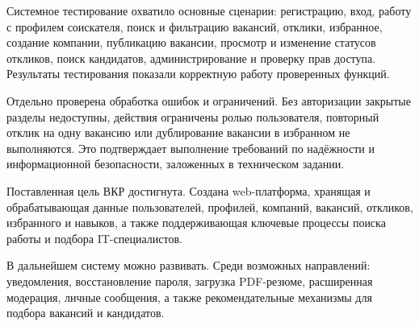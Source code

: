 Системное тестирование охватило основные сценарии: регистрацию, вход, работу с профилем соискателя, поиск и фильтрацию вакансий, отклики, избранное, создание компании, публикацию вакансии, просмотр и изменение статусов откликов, поиск кандидатов, администрирование и проверку прав доступа. Результаты тестирования показали корректную работу проверенных функций.

Отдельно проверена обработка ошибок и ограничений. Без авторизации закрытые разделы недоступны, действия ограничены ролью пользователя, повторный отклик на одну вакансию или дублирование вакансии в избранном не выполняются. Это подтверждает выполнение требований по надёжности и информационной безопасности, заложенных в техническом задании.

Поставленная цель ВКР достигнута. Создана web-платформа, хранящая и обрабатывающая данные пользователей, профилей, компаний, вакансий, откликов, избранного и навыков, а также поддерживающая ключевые процессы поиска работы и подбора IT-специалистов.

В дальнейшем систему можно развивать. Среди возможных направлений: уведомления, восстановление пароля, загрузка PDF-резюме, расширенная модерация, личные сообщения, а также рекомендательные механизмы для подбора вакансий и кандидатов. 
